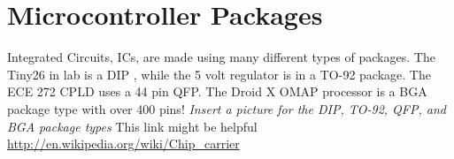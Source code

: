 \documentclass{article}
\begin{document}
\newpage
\section{Microcontroller Packages}
Integrated Circuits, ICs, are made using many different types of packages. The Tiny26 in lab is a DIP , while the 5 volt regulator is in a TO-92 package. The ECE 272 CPLD uses a 44 pin QFP. The Droid X OMAP processor is a BGA package type with over 400 pins! \newline
\newline
\emph{Insert a picture for the DIP, TO-92, QFP, and BGA package types}\newline
\newline
This link might be helpful \newline
\newline
\url{http://en.wikipedia.org/wiki/Chip_carrier}

\centering






\end{document}
